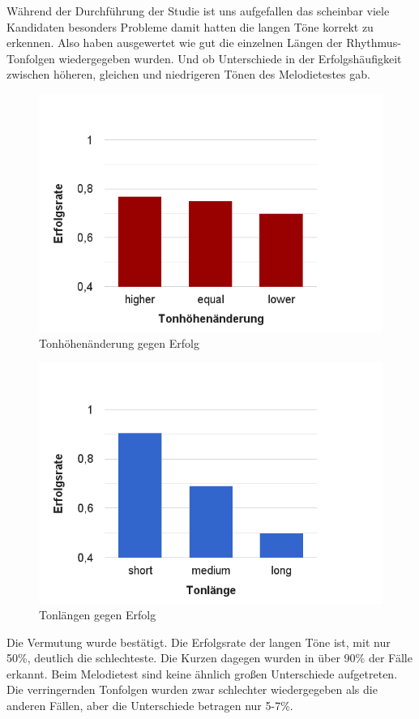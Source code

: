 \documentclass{acm_proc_article-sp}
\begin{document}
Während der Durchführung der Studie ist uns aufgefallen das scheinbar viele Kandidaten besonders Probleme damit hatten die langen Töne korrekt zu erkennen. Also haben ausgewertet wie gut die einzelnen Längen der Rhythmus-Tonfolgen wiedergegeben wurden. Und ob Unterschiede in der Erfolgshäufigkeit zwischen höheren, gleichen und niedrigeren Tönen des Melodietestes gab.
\begin{figure}[H]
\includegraphics[width=1.0\linewidth]{Abbildungen/Tonhoehenaenderung-Erfolg.png}
\caption{Tonhöhenänderung gegen Erfolg}
\label{Tonhöhen}
\end{figure}
\begin{figure}[H]
\includegraphics[width=1.0\linewidth]{Abbildungen/Tonlaenge-Erfolg.png}
\caption{Tonlängen gegen Erfolg}
\label{Tonlängen}
\end{figure}
Die Vermutung wurde bestätigt. Die Erfolgsrate der langen Töne ist, mit nur 50\%, deutlich die schlechteste. Die Kurzen dagegen wurden in über 90\% der Fälle erkannt. Beim Melodietest sind keine ähnlich großen Unterschiede aufgetreten. Die verringernden Tonfolgen wurden zwar schlechter wiedergegeben als die anderen Fällen, aber die Unterschiede betragen nur 5-7\%.
\end{document}
